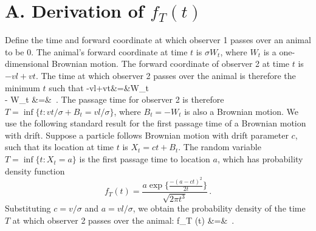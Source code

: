 \documentclass[useAMS, usenatbib, referee]{biom}\usepackage[]{graphicx}\usepackage[]{color}
\begin{document}



\appendix

\section{A. Derivation of $f_{T}(t)$}
\label{appx:firstpassage}

Define the time and forward coordinate at which observer 1 passes over an animal to be 0. The animal's forward coordinate at time $t$ is $\sigma W_t$, where $W_t$ is a one-dimensional Brownian motion. The forward coordinate of observer 2 at time $t$ is $-vl+vt$. The time at which observer 2 passes over the animal is therefore the minimum $t$ such that
\be
-vl+vt&=&\sigma W_t \nonumber \\
\Rightarrow \;\;\; - W_t &=& \,.
\ee
\noindent
The passage time for observer 2 is therefore $T=\inf\{t: vt/\sigma + B_t = vl/\sigma\}$, where $B_t=-W_t$ is also a Brownian motion. We use the following standard result for the first passage time of a Brownian motion with drift. Suppose a particle follows Brownian motion with drift parameter $c$, such that its location at time $t$ is $X_t=ct+B_t$. The random variable $T=\inf\{t: X_t=a\}$ is the first passage time to location $a$, which has probability density function
\begin{equation}
f_{T} (t) = \frac{ a \exp \Big\{ \frac{- (a-ct)^2}{2t} \Big\} }{\sqrt{2 \pi t^3}}\,.
\end{equation}
\noindent
Substituting $c=v/\sigma$ and $a=vl/\sigma$, we obtain the probability density of the time $T$ at which observer 2 passes over the animal:
\be
f_{T} (t)
&=&
\,.
\ee
\end{document}
